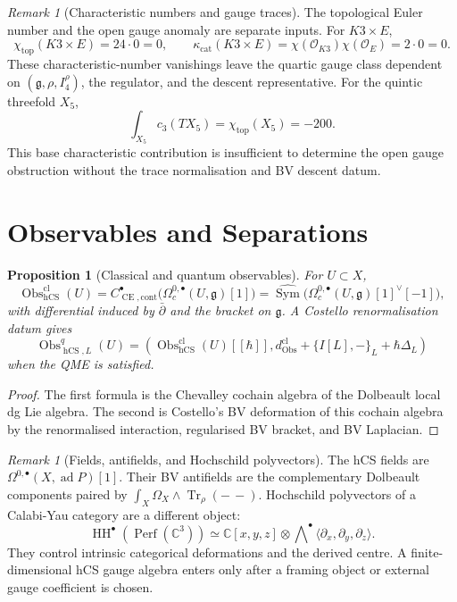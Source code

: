 \documentclass[11pt]{article}
\newtheorem{proposition}[theorem]{Proposition}
\theoremstyle{definition}
\theoremstyle{remark}
\newtheorem{remark}[theorem]{Remark}
\providecommand{\C}{\mathbb{C}}
\providecommand{\dbar}{\bar{\partial}}
\providecommand{\fg}{\mathfrak{g}}
\providecommand{\Tr}{\operatorname{Tr}}
\providecommand{\Sym}{\operatorname{Sym}}
\providecommand{\Perf}{\operatorname{Perf}}
\providecommand{\HH}{\operatorname{HH}}
\providecommand{\Obs}{\operatorname{Obs}}
\providecommand{\CE}{\operatorname{CE}}
\providecommand{\hCS}{\operatorname{hCS}}
\providecommand{\cO}{\mathcal{O}}
\providecommand{\kcat}{\kappa_{\mathrm{cat}}}
\begin{document}
\begin{remark}[Characteristic numbers and gauge traces]
\label{rem:characteristic-numbers}
The topological Euler number and the open gauge anomaly are separate
inputs.  For $K3\times E$,
\[
  \chi_{\mathrm{top}}(K3\times E)=24\cdot0=0,
  \qquad
  \kcat(K3\times E)=\chi(\cO_{K3})\chi(\cO_E)=2\cdot0=0.
\]
These characteristic-number vanishings leave the quartic gauge class
dependent on $(\fg,\rho,I_4^\rho)$, the regulator, and the descent
representative.  For the quintic threefold $X_5$,
\[
  \int_{X_5}c_3(TX_5)=\chi_{\mathrm{top}}(X_5)=-200.
\]
This base characteristic contribution is insufficient to determine the
open gauge obstruction without the trace normalisation and BV descent
datum.
\end{remark}

\section{Observables and Separations}
\label{sec:observables-separations}

\begin{proposition}[Classical and quantum observables]
\label{prop:observables}
For $U\subset X$,
\[
  \Obs^{\mathrm{cl}}_{\hCS}(U)
  =
  C^\bullet_{\CE,\mathrm{cont}}
  \bigl(\Omega^{0,\bullet}_c(U,\fg)[1]\bigr)
  =
  \widehat{\Sym}
  \bigl(\Omega^{0,\bullet}_c(U,\fg)[1]^\vee[-1]\bigr),
\]
with differential induced by $\dbar$ and the bracket on $\fg$.  A
Costello renormalisation datum gives
\[
  \Obs^q_{\hCS,L}(U)
  =
  \left(
    \Obs^{\mathrm{cl}}_{\hCS}(U)[[\hbar]],
    d_{\Obs}^{\mathrm{cl}}+\{I[L],-\}_L+\hbar\Delta_L
  \right)
\]
when the QME is satisfied.
\end{proposition}

\begin{proof}
The first formula is the Chevalley cochain algebra of the Dolbeault
local dg Lie algebra.  The second is Costello's BV deformation of this
cochain algebra by the renormalised interaction, regularised BV bracket,
and BV Laplacian.
\end{proof}

\begin{remark}[Fields, antifields, and Hochschild polyvectors]
\label{rem:field-polyvector-separation}
The hCS fields are
$\Omega^{0,\bullet}(X,\operatorname{ad}P)[1]$.  Their BV antifields are
the complementary Dolbeault components paired by
$\int_X\Omega_X\wedge\Tr_\rho(-\, -)$.  Hochschild polyvectors of a
Calabi-Yau category are a different object:
\[
  \HH^\bullet(\Perf(\C^3))
  \simeq
  \C[x,y,z]\otimes
  \bigwedge\nolimits^\bullet
  \langle\partial_x,\partial_y,\partial_z\rangle .
\]
They control intrinsic categorical deformations and the derived centre.
A finite-dimensional hCS gauge algebra enters only after a framing
object or external gauge coefficient is chosen.
\end{remark}
\end{document}
